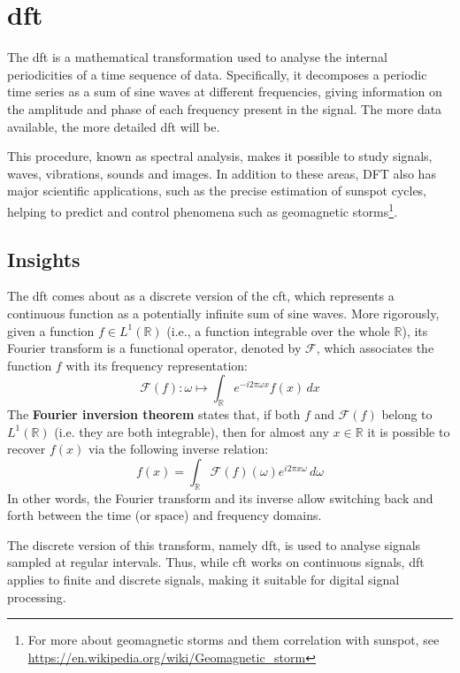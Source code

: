 \section{\gls{dft}}
The \gls{dft} is a mathematical transformation used to analyse the internal periodicities of a time sequence of data. Specifically, it decomposes a periodic time series as a sum of sine waves at different frequencies, giving information on the amplitude and phase of each frequency present in the signal. The more data available, the more detailed \gls{dft} will be.

\noindent This procedure, known as spectral analysis, makes it possible to study signals, waves, vibrations, sounds and images. In addition to these areas, DFT also has major scientific applications, such as the precise estimation of sunspot cycles, helping to predict and control phenomena such as geomagnetic storms\footnote{For more about geomagnetic storms and them correlation with sunspot, see \url{https://en.wikipedia.org/wiki/Geomagnetic_storm}}.

\subsection{Insights}
The \gls{dft} comes about as a discrete version of the \gls{cft}, which represents a continuous function as a potentially infinite sum of sine waves. More rigorously, given a function $f\in L^1\left(\mathbb{R}\right)$ (i.e., a function integrable over the whole $\mathbb{R}$), its Fourier transform is a functional operator, denoted by $\mathcal{F}$, which associates the function $f$ with its frequency representation:
\[
\mathcal{F}(f): \omega \mapsto \int_{\mathbb{R}} e^{-i2\pi \omega x}f(x)\,dx
\]
The \textbf{Fourier inversion theorem} states that, if both $f$ and $\mathcal{F}(f)$ belong to $L^1(\mathbb{R})$ (i.e. they are both integrable), then for almost any $x\in\mathbb{R}$ it is possible to recover $f(x)$ via the following inverse relation:
\[
f(x)=\int_{\mathbb{R}}{\mathcal{F}\left(f\right)}(\omega)e^{i2\pi x\omega}\,d\omega
\]
In other words, the Fourier transform and its inverse allow switching back and forth between the time (or space) and frequency domains.

\bigskip
The discrete version of this transform, namely \gls{dft}, is used to analyse signals sampled at regular intervals. Thus, while \gls{cft} works on continuous signals, \gls{dft} applies to finite and discrete signals, making it suitable for digital signal processing.

